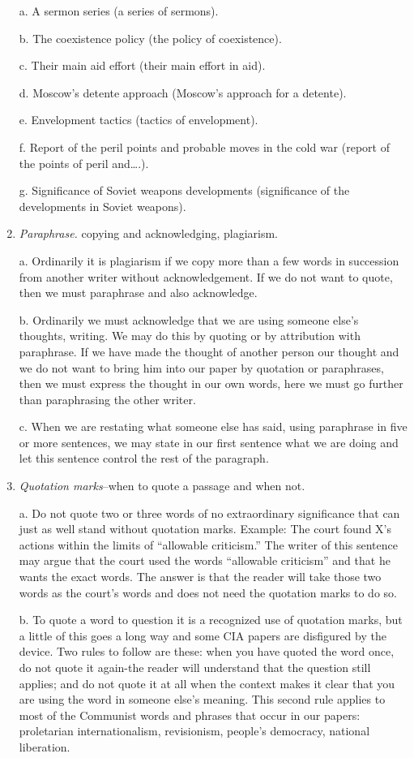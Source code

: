 \documentclass[
    oneside,
    11pt,
]{memoir}
\begin{document}
\begin{enumerate}
  a. A sermon series (a series of sermons). 
  
  b. The coexistence policy (the policy of coexistence).
  
  c. Their main aid effort (their main effort in aid).
  
  d. Moscow's detente approach (Moscow's approach for a detente).
  
  e. Envelopment tactics (tactics of envelopment).
  
  f. Report of the peril points and probable moves in the cold war (report of the points of peril and\dots.).
  
  g. Significance of Soviet weapons developments (significance of the developments in Soviet weapons).

  \item \emph{Paraphrase.} copying and acknowledging, plagiarism.
  
  a. Ordinarily it is plagiarism if we copy more than a few words in succession from another writer without acknowledgement. If we do not want to quote, then we must paraphrase and also acknowledge. 
  
  b. Ordinarily we must acknowledge that we are using someone else's thoughts, writing. We may do this by quoting or by attribution with paraphrase. If we have made the thought of another person our thought and we do not want to bring him into our paper by quotation or paraphrases, then we must express the thought in our own words, here we must go further than paraphrasing the other writer. 
  
  c. When we are restating what someone else has said, using paraphrase in five or more sentences, we may state in our first sentence what we are doing and let this sentence control the rest of the paragraph. 

  \item \emph{Quotation marks}--when to quote a passage and when not.
  
  a. Do not quote two or three words of no extraordinary significance that can just as well stand without quotation marks. Example: The court found X's actions within the limits of \enquote{allowable criticism.} The writer of this sentence may argue that the court used the words \enquote{allowable criticism} and that he wants the exact words. The answer is that the reader will take those two words as the court's words and does not need the quotation marks to do so.
  
  b. To quote a word to question it is a recognized use of quotation marks, but a little of this goes a long way and some CIA papers are disfigured by the device. Two rules to follow are these: when you have quoted the word once, do not quote it again-the reader will understand that the question still applies; and do not quote it at all when the context makes it clear that you are using the word in someone else's meaning. This second rule applies to most of the Communist words and phrases that occur in our papers: proletarian internationalism, revisionism, people's democracy, national liberation.
  

\end{enumerate}
\end{document}
